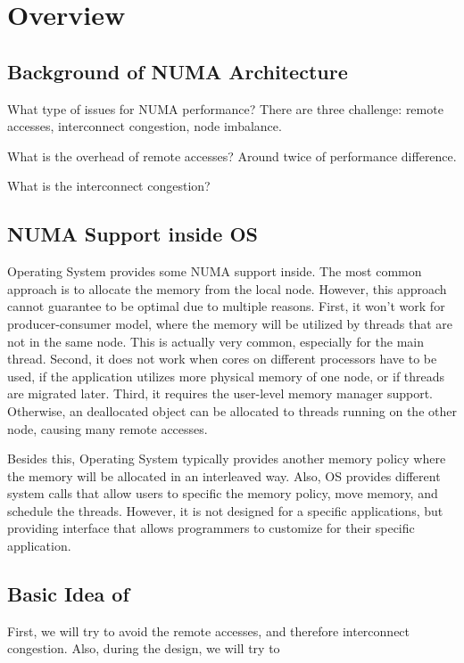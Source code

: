 \section{Overview}
\label{sec:overview}

\subsection{Background of NUMA Architecture}

What type of issues for NUMA performance? 
There are three challenge: remote accesses, interconnect congestion, node imbalance. 

What is the overhead of remote accesses? Around twice of performance difference. 

What is the interconnect congestion? 

\subsection{NUMA Support inside OS}

Operating System provides some NUMA support inside. The most common approach is to allocate the memory from the local node. However, this approach cannot guarantee to be optimal due to multiple reasons. First, it won't work for producer-consumer model, where the memory will be utilized by threads that are not in the same node. This is actually very common, especially for the main thread. Second, it does not work when cores on different processors have to be used, if the application utilizes more physical memory of one node, or if threads are migrated later. Third, it requires the user-level memory manager support. Otherwise, an deallocated object can be allocated to threads running on the other node, causing many remote accesses. 

Besides this, Operating System typically provides another memory policy where the memory will be allocated in an interleaved way. Also, OS provides different system calls that allow users to specific the memory policy, move memory, and schedule the threads. However, it is not designed for a specific applications, but providing interface that allows programmers to customize for their specific application.   


\subsection{Basic Idea of \NA{}}
First, we will try to avoid the remote accesses, and therefore interconnect congestion. Also, during the design, we will try to 

